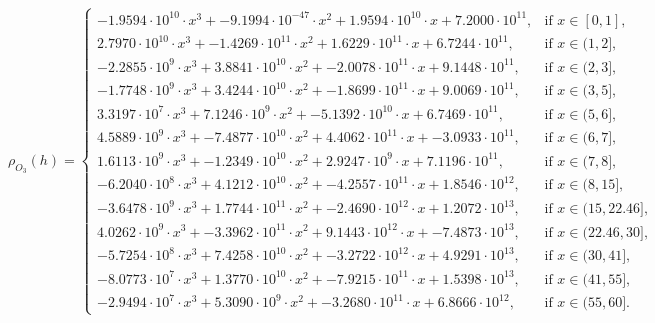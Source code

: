\documentclass[preprint,journal]{vgtc}       %
\begin{document}
\begin{equation}
    \rho_{O_3}(h) = \begin{cases}-1.9594 \cdot 10^{10}\cdot x^3 + -9.1994 \cdot 10^{-47}\cdot x^2 + 1.9594 \cdot 10^{10}\cdot x + 7.2000 \cdot 10^{11}, & \text{if } x \in [0,1], \\2.7970 \cdot 10^{10}\cdot x^3 + -1.4269 \cdot 10^{11}\cdot x^2 + 1.6229 \cdot 10^{11}\cdot x + 6.7244 \cdot 10^{11}, & \text{if } x \in (1,2], \\-2.2855 \cdot 10^{9}\cdot x^3 + 3.8841 \cdot 10^{10}\cdot x^2 + -2.0078 \cdot 10^{11}\cdot x + 9.1448 \cdot 10^{11}, & \text{if } x \in (2,3], \\-1.7748 \cdot 10^{9}\cdot x^3 + 3.4244 \cdot 10^{10}\cdot x^2 + -1.8699 \cdot 10^{11}\cdot x + 9.0069 \cdot 10^{11}, & \text{if } x \in (3,5], \\3.3197 \cdot 10^{7}\cdot x^3 + 7.1246 \cdot 10^{9}\cdot x^2 + -5.1392 \cdot 10^{10}\cdot x + 6.7469 \cdot 10^{11}, & \text{if } x \in (5,6], \\4.5889 \cdot 10^{9}\cdot x^3 + -7.4877 \cdot 10^{10}\cdot x^2 + 4.4062 \cdot 10^{11}\cdot x + -3.0933 \cdot 10^{11}, & \text{if } x \in (6,7], \\1.6113 \cdot 10^{9}\cdot x^3 + -1.2349 \cdot 10^{10}\cdot x^2 + 2.9247 \cdot 10^{9}\cdot x + 7.1196 \cdot 10^{11}, & \text{if } x \in (7,8], \\-6.2040 \cdot 10^{8}\cdot x^3 + 4.1212 \cdot 10^{10}\cdot x^2 + -4.2557 \cdot 10^{11}\cdot x + 1.8546 \cdot 10^{12}, & \text{if } x \in (8,15], \\-3.6478 \cdot 10^{9}\cdot x^3 + 1.7744 \cdot 10^{11}\cdot x^2 + -2.4690 \cdot 10^{12}\cdot x + 1.2072 \cdot 10^{13}, & \text{if } x \in (15,22.46], \\4.0262 \cdot 10^{9}\cdot x^3 + -3.3962 \cdot 10^{11}\cdot x^2 + 9.1443 \cdot 10^{12}\cdot x + -7.4873 \cdot 10^{13}, & \text{if } x \in (22.46,30], \\-5.7254 \cdot 10^{8}\cdot x^3 + 7.4258 \cdot 10^{10}\cdot x^2 + -3.2722 \cdot 10^{12}\cdot x + 4.9291 \cdot 10^{13}, & \text{if } x \in (30,41], \\-8.0773 \cdot 10^{7}\cdot x^3 + 1.3770 \cdot 10^{10}\cdot x^2 + -7.9215 \cdot 10^{11}\cdot x + 1.5398 \cdot 10^{13}, & \text{if } x \in (41,55], \\-2.9494 \cdot 10^{7}\cdot x^3 + 5.3090 \cdot 10^{9}\cdot x^2 + -3.2680 \cdot 10^{11}\cdot x + 6.8666 \cdot 10^{12}, & \text{if } x \in (55,60].\end{cases}
    \label{eq:ozone-concentration-spline}
\end{equation}
\end{document}
